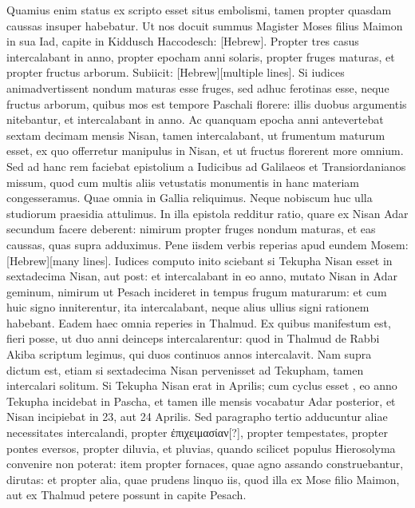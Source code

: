 Quamius enim status ex scripto esset situs embolismi,
 tamen propter
quasdam caussas insuper habebatur.
Ut nos docuit summus Magister
Moses filius Maimon in sua Iad, capite in Kiddusch Haccodesch:
\texthebrew{[Hebrew]}.
Propter
tres casus intercalabant in anno, propter epocham anni solaris,
propter fruges maturas, et propter fructus arborum.
Subiicit:
\texthebrew{[Hebrew][multiple lines]}.
Si iudices animadvertissent nondum
maturas esse fruges, sed adhuc ferotinas esse, neque fructus arborum,
quibus mos est tempore Paschali florere: illis duobus argumentis nitebantur,
et intercalabant in anno.
Ac quanquam epocha anni antevertebat
sextam decimam mensis Nisan, tamen intercalabant, ut
frumentum maturum esset, ex quo offerretur manipulus in 
Nisan, et ut fructus florerent more omnium.
Sed ad hanc rem
faciebat epistolium a Iudicibus ad Galilaeos et Transiordanianos
missum, quod cum multis aliis vetustatis monumentis in hanc materiam
congesseramus.
Quae omnia in Gallia reliquimus.
Neque nobiscum
huc ulla studiorum praesidia attulimus.
In illa epistola redditur
ratio, quare ex Nisan Adar secundum facere deberent: nimirum propter
fruges nondum maturas, et eas caussas, quas supra adduximus.
Pene iisdem verbis reperias apud eundem Mosem:
 \texthebrew{[Hebrew][many lines]}.
Iudices computo inito sciebant si Tekupha Nisan esset in sextadecima
Nisan, aut post: et intercalabant in eo anno, mutato Nisan in
Adar geminum, nimirum ut Pesach incideret in tempus frugum maturarum:
et cum huic signo inniterentur, ita intercalabant, neque
alius ullius signi rationem habebant.
Eadem haec omnia reperies in
Thalmud.
Ex quibus manifestum est, fieri posse, ut duo anni deinceps
intercalarentur: quod in Thalmud de Rabbi Akiba scriptum legimus,
qui duos continuos annos intercalavit.
Nam supra dictum est,
etiam si sextadecima Nisan pervenisset ad Tekupham, tamen intercalari
solitum.
Si Tekupha Nisan erat in  Aprilis; cum cyclus esset
, eo anno Tekupha incidebat in Pascha, et tamen ille mensis
vocabatur Adar posterior, et Nisan incipiebat in 23, aut 24 Aprilis.
Sed paragrapho tertio adducuntur aliae necessitates intercalandi,
propter \textgreek{ἐπιχειμασίαν[?]}, propter tempestates, propter pontes eversos,
propter diluvia, et pluvias, quando scilicet populus Hierosolyma
convenire non poterat: item propter fornaces, quae agno assando construebantur,
dirutas: et propter alia, quae prudens linquo iis, quod illa
ex Mose filio Maimon, aut ex Thalmud petere possunt in capite Pesach.

